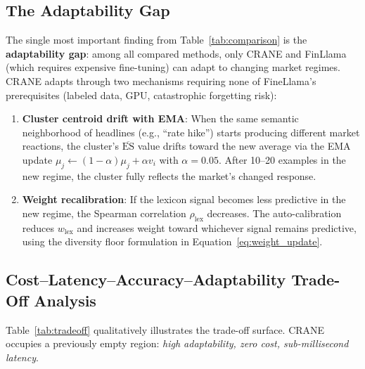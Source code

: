 \subsection{The Adaptability Gap}

The single most important finding from Table~\ref{tab:comparison} is the \textbf{adaptability gap}: among all compared methods, only CRANE and FinLlama (which requires expensive fine-tuning) can adapt to changing market regimes. CRANE adapts through two mechanisms requiring none of FineLlama's prerequisites (labeled data, GPU, catastrophic forgetting risk):

\begin{enumerate}
    \item \textbf{Cluster centroid drift with EMA}: When the same semantic neighborhood of headlines (e.g., ``rate hike'') starts producing different market reactions, the cluster's $\overline{\text{ES}}$ value drifts toward the new average via the EMA update $\mu_j \leftarrow (1-\alpha)\mu_j + \alpha v_i$ with $\alpha = 0.05$. After 10--20 examples in the new regime, the cluster fully reflects the market's changed response.

    \item \textbf{Weight recalibration}: If the lexicon signal becomes less predictive in the new regime, the Spearman correlation $\rho_{\text{lex}}$ decreases. The auto-calibration reduces $w_{\text{lex}}$ and increases weight toward whichever signal remains predictive, using the diversity floor formulation in Equation~\ref{eq:weight_update}.
\end{enumerate}

\subsection{Cost--Latency--Accuracy--Adaptability Trade-Off Analysis}

Table~\ref{tab:tradeoff} qualitatively illustrates the trade-off surface. CRANE occupies a previously empty region: \emph{high adaptability, zero cost, sub-millisecond latency}.

